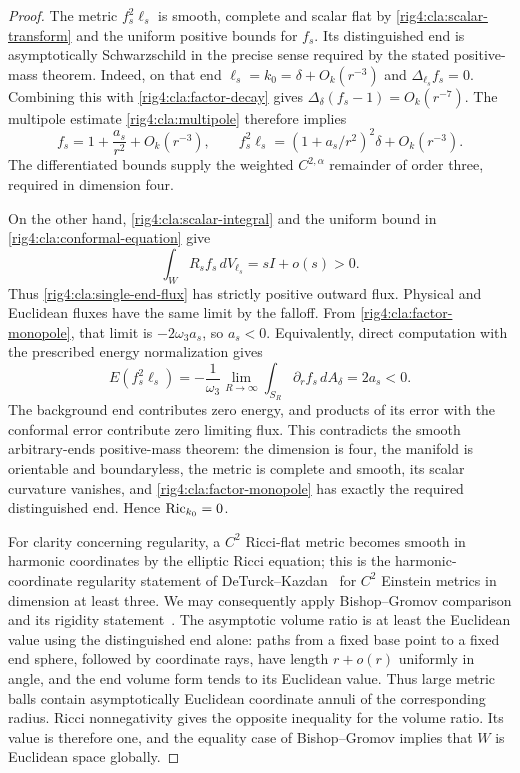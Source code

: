 \begin{proof}
The metric $f_s^2\ell_s$ is smooth, complete and scalar flat by
\eqref{rig4:cla:scalar-transform} and the uniform positive bounds for
$f_s$.  Its distinguished end is asymptotically Schwarzschild in
the precise sense required by the stated positive-mass theorem.
Indeed, on that end $\ell_s=k_0=\delta+O_k(r^{-3})$ and
$\Delta_{\ell_s}f_s=0$.  Combining this with
\eqref{rig4:cla:factor-decay} gives
$\Delta_\delta(f_s-1)=O_k(r^{-7})$.
The multipole estimate \eqref{rig4:cla:multipole} therefore implies
\begin{equation}\label{rig4:cla:factor-monopole}
 f_s=1+\frac{a_s}{r^2}+O_k(r^{-3}),\qquad
 f_s^2\ell_s=(1+a_s/r^2)^2\delta+O_k(r^{-3}).
\end{equation}
The differentiated bounds supply the weighted $C^{2,\alpha}$
remainder of order three, required in dimension four.

On the other hand, \eqref{rig4:cla:scalar-integral} and the uniform
bound in \eqref{rig4:cla:conformal-equation} give
\[
 \int_W R_sf_s\,dV_{\ell_s}=sI+o(s)>0.
\]
Thus \eqref{rig4:cla:single-end-flux} has strictly positive outward
flux.  Physical and Euclidean fluxes have the same limit by the
falloff.  From \eqref{rig4:cla:factor-monopole}, that limit is
$-2\omega_3a_s$, so $a_s<0$.  Equivalently, direct computation with
the prescribed energy normalization gives
\begin{equation}\label{rig4:cla:negative-mass}
 E(f_s^2\ell_s)
   =-\frac1{\omega_3}
        \lim_{R\to\infty}\int_{S_R}\partial_r f_s\,dA_\delta
   =2a_s<0.
\end{equation}
The background end contributes zero energy, and products of its
error with the conformal error contribute zero limiting flux.
This contradicts the smooth arbitrary-ends positive-mass theorem:
the dimension is four, the manifold is orientable and boundaryless,
the metric is complete and smooth, its scalar curvature vanishes,
and \eqref{rig4:cla:factor-monopole} has exactly the required distinguished
end.  Hence $\operatorname{Ric}_{k_0}=0$.

For clarity concerning regularity, a $C^2$ Ricci-flat metric becomes
smooth in harmonic coordinates by the elliptic Ricci equation;
this is the harmonic-coordinate regularity statement of
DeTurck--Kazdan~\cite[Theorem~5.2]{DeTurckKazdan1981} for $C^2$ Einstein
metrics in dimension at least three.
We may consequently apply Bishop--Gromov comparison and its
rigidity statement~\cite{Petersen2016}.  The asymptotic volume ratio
is at least the Euclidean value using the distinguished end alone:
paths from a fixed base point to a fixed end sphere, followed by
coordinate rays, have length $r+o(r)$ uniformly in angle, and the
end volume form tends to its Euclidean value.  Thus large metric
balls contain asymptotically Euclidean coordinate annuli of the
corresponding radius.  Ricci nonnegativity gives the opposite
inequality for the volume ratio.  Its value is therefore one, and
the equality case of Bishop--Gromov implies that $W$ is Euclidean
space globally.


\end{proof}
